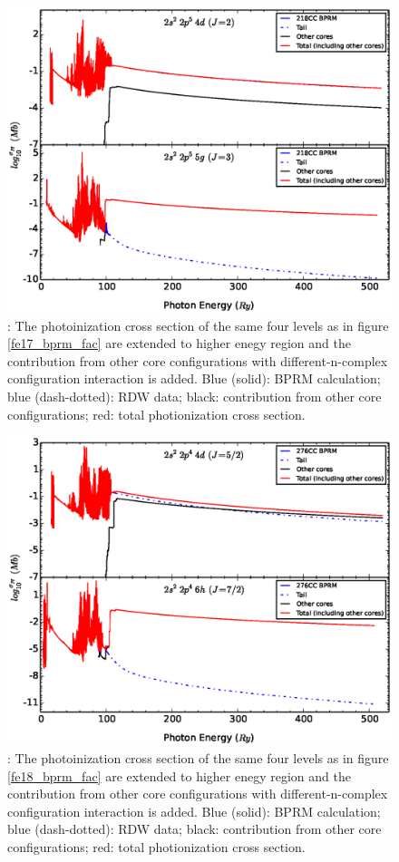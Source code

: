 \begin{figure}
	\centering
		\includegraphics[width=.9\textwidth]{figures/fe17_tail_other_targets.eps}
	\caption{: The photoinization cross section of the same four levels as in figure \ref{fe17_bprm_fac} are extended to higher enegy region and the contribution from other core configurations with different-n-complex configuration interaction is added. Blue (solid): BPRM calculation; blue (dash-dotted): RDW data; black: contribution from other core configurations; red: total photionization cross section.}
	\label{fig_fe17_tail_other}
\end{figure}

\begin{figure}
	\centering
		\includegraphics[width=.9\textwidth]{figures/fe18_tail_other_targets.eps}
	\caption{: The photoinization cross section of the same four levels as in figure \ref{fe18_bprm_fac} are extended to higher enegy region and the contribution from other core configurations with different-n-complex configuration interaction is added. Blue (solid): BPRM calculation; blue (dash-dotted): RDW data; black: contribution from other core configurations; red: total photionization cross section.}
	\label{fig_fe18_tail_other}
\end{figure}


